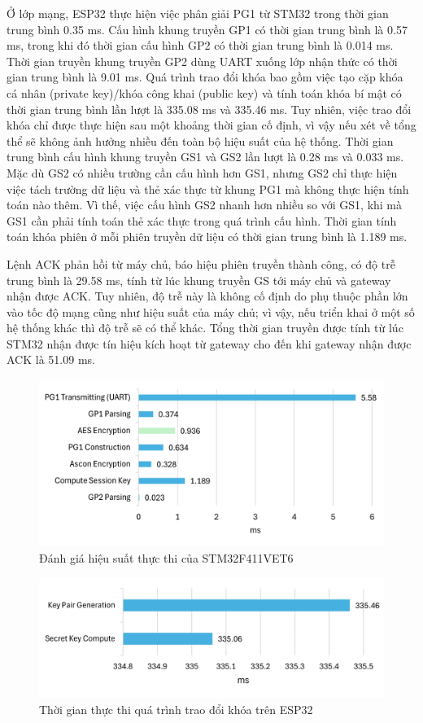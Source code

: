 Ở lớp mạng, ESP32 thực hiện việc phân giải PG1 từ STM32 trong thời gian trung bình 0.35 ms. Cấu hình khung truyền GP1 có thời gian trung bình là 0.57 ms, trong khi đó thời gian cấu hình GP2 có thời gian trung bình là 0.014 ms. Thời gian truyền khung truyền GP2 dùng UART xuống lớp nhận thức có thời gian trung bình là 9.01 ms. Quá trình trao đổi khóa bao gồm việc tạo cặp khóa cá nhân (private key)/khóa công khai (public key) và tính toán khóa bí mật có thời gian trung bình lần lượt là 335.08 ms và 335.46 ms. Tuy nhiên, việc trao đổi khóa chỉ được thực hiện sau một khoảng thời gian cố định, vì vậy nếu xét về tổng thể sẽ không ảnh hưởng nhiều đến toàn bộ hiệu suất của hệ thống. Thời gian trung bình cấu hình khung truyền GS1 và GS2 lần lượt là 0.28 ms và 0.033 ms. Mặc dù GS2 có nhiều trường cần cấu hình hơn GS1, nhưng GS2 chỉ thực hiện việc tách trường dữ liệu và thẻ xác thực từ khung PG1 mà không thực hiện tính toán nào thêm. Vì thế, việc cấu hình GS2 nhanh hơn nhiều so với GS1, khi mà GS1 cần phải tính toán thẻ xác thực trong quá trình cấu hình. Thời gian tính toán khóa phiên ở mỗi phiên truyền dữ liệu có thời gian trung bình là 1.189 ms.

Lệnh ACK phản hồi từ máy chủ, báo hiệu phiên truyền thành công, có độ trễ trung bình là 29.58 ms, tính từ lúc khung truyền GS tới máy chủ và gateway nhận được ACK. Tuy nhiên, độ trễ này là không cố định do phụ thuộc phần lớn vào tốc độ mạng cũng như hiệu suất của máy chủ; vì vậy, nếu triển khai ở một số hệ thống khác thì độ trễ sẽ có thể khác. Tổng thời gian truyền được tính từ lúc STM32 nhận được tín hiệu kích hoạt từ gateway cho đến khi gateway nhận được ACK là 51.09 ms.

\begin{figure}[H]
    \centering
    \includegraphics[width=0.75\linewidth]{stm32-2.png}
    \caption{Đánh giá hiệu suất thực thi của STM32F411VET6}
    \label{fig:stm32}
\end{figure}

\begin{figure}[H]
    \centering
    \includegraphics[width=0.75\linewidth]{ke.png}
    \caption{Thời gian thực thi quá trình trao đổi khóa trên ESP32}
    \label{fig:ke}
\end{figure}

